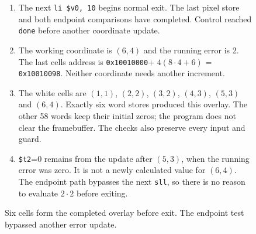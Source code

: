 \begin{figure}[htbp]
  \par\smallskip
  \begin{minipage}{\linewidth}
    \small
    \begin{enumerate}
      \item The next \texttt{li \$v0, 10} begins normal exit. The last pixel store and both endpoint comparisons have completed. Control reached \texttt{done} before another coordinate update.
      \item The working coordinate is $(6,4)$ and the running error is 2. The last cell\textquotesingle s address is \texttt{0x10010000}+ $4(8\cdot4+6)$ = \texttt{0x10010098}. Neither coordinate needs another increment.
      \item The white cells are $(1,1)$, $(2,2)$, $(3,2)$, $(4,3)$, $(5,3)$ and $(6,4)$. Exactly six word stores produced this overlay. The other 58 words keep their initial zeros; the program does not clear the framebuffer. The checks also preserve every input and guard.
      \item \texttt{\$t2}=0 remains from the update after $(5,3)$, when the running error was zero. It is not a newly calculated value for $(6,4)$. The endpoint path bypasses the next \texttt{sll}, so there is no reason to evaluate $2\cdot2$ before exiting.
    \end{enumerate}
  \end{minipage}
  \caption{Six cells form the completed overlay before exit. The endpoint test bypassed another error update.}
  \label{capture:007-bresenham-line-f04-complete}
\end{figure}
\par
